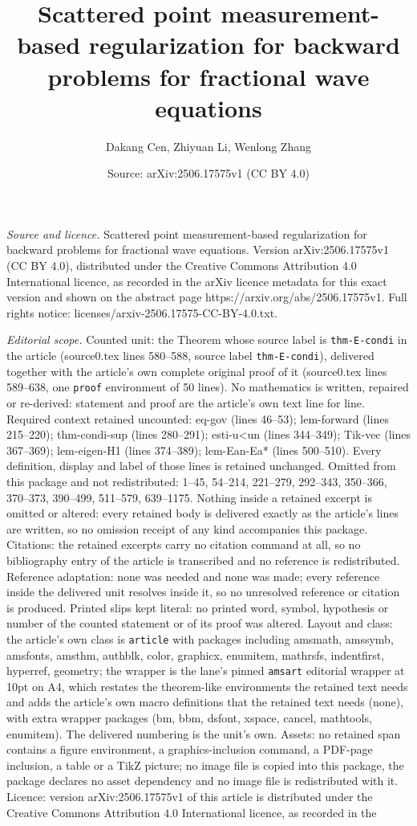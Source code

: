 \documentclass[10pt,a4paper]{amsart}
\title[Scattered point measurement-based regularization for backwar]{Scattered point measurement-based regularization for backward problems for fractional wave equations}
\author{Dakang Cen, Zhiyuan Li, Wenlong Zhang}
\date{Source: arXiv:2506.17575v1 (CC BY 4.0)}
\begin{document}
\maketitle

\noindent\emph{Source and licence.} Scattered point measurement-based regularization for backward problems for fractional wave equations. Version arXiv:2506.17575v1 (CC BY 4.0), distributed under the Creative Commons Attribution 4.0 International licence, as recorded in the arXiv licence metadata for this exact version and shown on the abstract page https://arxiv.org/abs/2506.17575v1. Full rights notice: licenses/arxiv-2506.17575-CC-BY-4.0.txt.\par\smallskip

\noindent\textit{Editorial scope.} Counted unit: the Theorem whose source label is \texttt{thm-E-condi} in the article (source0.tex lines 580--588, source label \texttt{thm-E-condi}), delivered together with the article's own complete original proof of it (source0.tex lines 589--638, one \texttt{proof} environment of 50 lines). No mathematics is written, repaired or re-derived: statement and proof are the article's own text line for line. Required context retained uncounted: eq-gov (lines 46--53); lem-forward (lines 215--220); thm-condi-sup (lines 280--291); esti-u<un (lines 344--349); Tik-vec (lines 367--369); lem-eigen-H1 (lines 374--389); lem-Ean-Ea* (lines 500--510). Every definition, display and label of those lines is retained unchanged. Omitted from this package and not redistributed: 1--45, 54--214, 221--279, 292--343, 350--366, 370--373, 390--499, 511--579, 639--1175. Nothing inside a retained excerpt is omitted or altered: every retained body is delivered exactly as the article's lines are written, so no omission receipt of any kind accompanies this package. Citations: the retained excerpts carry no citation command at all, so no bibliography entry of the article is transcribed and no reference is redistributed. Reference adaptation: none was needed and none was made; every reference inside the delivered unit resolves inside it, so no unresolved reference or citation is produced. Printed slips kept literal: no printed word, symbol, hypothesis or number of the counted statement or of its proof was altered. Layout and class: the article's own class is \texttt{article} with packages including amsmath, amssymb, amsfonts, amsthm, authblk, color, graphicx, enumitem, mathrsfs, indentfirst, hyperref, geometry; the wrapper is the lane's pinned \texttt{amsart} editorial wrapper at 10pt on A4, which restates the theorem-like environments the retained text needs and adds the article's own macro definitions that the retained text needs (none), with extra wrapper packages (bm, bbm, dsfont, xspace, cancel, mathtools, enumitem). The delivered numbering is the unit's own. Assets: no retained span contains a figure environment, a graphics-inclusion command, a PDF-page inclusion, a table or a TikZ picture; no image file is copied into this package, the package declares no asset dependency and no image file is redistributed with it. Licence: version arXiv:2506.17575v1 of this article is distributed under the Creative Commons Attribution 4.0 International licence, as recorded in the 
\end{document}
